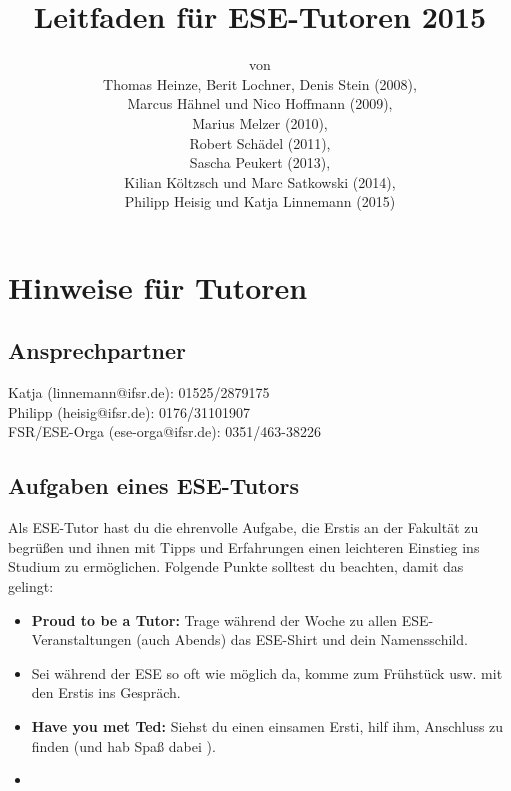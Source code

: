 \documentclass[a4paper,12pt]{report}
\begin{document}
\title{\textbf{Leitfaden für ESE-Tutoren 2015}\\}
\date{}
\author{von\\Thomas Heinze, Berit Lochner, Denis Stein (2008), \\Marcus Hähnel und Nico Hoffmann (2009), \\Marius Melzer (2010), \\Robert Schädel (2011),\\Sascha Peukert (2013), \\Kilian Költzsch und Marc Satkowski (2014), \\Philipp Heisig und Katja Linnemann (2015)}
\maketitle
\tableofcontents
\chapter{Hinweise für Tutoren}
\section{Ansprechpartner}
Katja (linnemann@ifsr.de): 01525/2879175\\
Philipp (heisig@ifsr.de): 0176/31101907 \\
FSR/ESE-Orga (ese-orga@ifsr.de): 0351/463-38226

\section{Aufgaben eines ESE-Tutors}
Als ESE-Tutor hast du die ehrenvolle Aufgabe, die Erstis an der Fakultät zu begrüßen und ihnen mit Tipps und Erfahrungen einen leichteren Einstieg ins Studium zu ermöglichen. Folgende Punkte solltest du beachten, damit das gelingt:
\begin{itemize}
	\item \textbf{Proud to be a Tutor:} Trage während der Woche zu allen ESE-Veranstaltungen (auch Abends) das ESE-Shirt und dein Namensschild.
	\item \textbf{} Sei während der ESE so oft wie möglich da, komme zum Frühstück usw. mit den Erstis ins Gespräch.
	\item \textbf{Have you met Ted:} Siehst du einen einsamen Ersti, hilf ihm, Anschluss zu finden (und hab Spaß dabei \Winkey ).
	\item \textbf{} 
\end{itemize}
\end{document}
